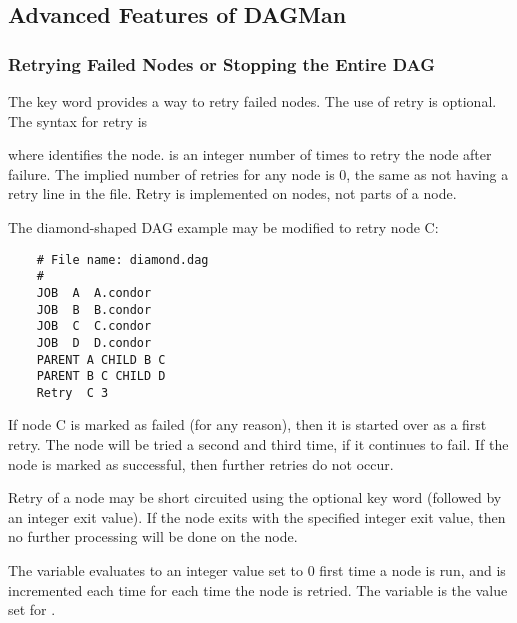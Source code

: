 \subsection{\label{sec:AdvDAGMan}Advanced Features of DAGMan}


\subsubsection{\label{dagman:retry}Retrying Failed Nodes or Stopping the Entire DAG}


The  key word provides a
way to retry failed nodes.
The use of retry is optional.
The syntax for retry is

   

where  identifies the node.
 is an integer
number of times to retry the node after failure.
The implied number of retries for any node is 0,
the same as not having a retry line in the file. 
Retry is implemented on nodes, not parts of a node.

The diamond-shaped DAG example may be modified to
retry node C:

\footnotesize
\begin{verbatim}
    # File name: diamond.dag
    #
    JOB  A  A.condor 
    JOB  B  B.condor 
    JOB  C  C.condor	
    JOB  D  D.condor
    PARENT A CHILD B C
    PARENT B C CHILD D
    Retry  C 3
\end{verbatim}
\normalsize

If node C is marked as failed (for any reason),
then it is started over as a first retry.
The node will be tried a second and third time,
if it continues to fail.
If the node is marked as successful, then further retries do not occur.

Retry of a node may be short circuited using the
optional key word  (followed by an
integer exit value).
If the node exits with the specified integer exit value,
then no further processing will be done
on the node. 

The variable  evaluates to an 
integer value set to 0 first time a node is run,
and is  incremented each time for each time the node is retried. 
The variable  is the value set for
.


